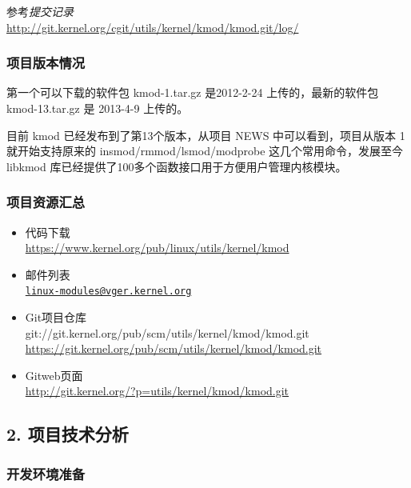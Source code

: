 \documentclass[11pt,a4paper]{article}
\begin{document}
参考\emph{提交记录}\\\url{http://git.kernel.org/cgit/utils/kernel/kmod/kmod.git/log/}

\subsubsection{项目版本情况}

第一个可以下载的软件包 kmod-1.tar.gz 是2012-2-24 上传的，最新的软件包
kmod-13.tar.gz 是 2013-4-9 上传的。

目前 kmod 已经发布到了第13个版本，从项目 NEWS 中可以看到，项目从版本 1
就开始支持原来的 insmod/rmmod/lsmod/modprobe
这几个常用命令，发展至今libkmod
库已经提供了100多个函数接口用于方便用户管理内核模块。

\subsubsection{项目资源汇总}

\begin{itemize}
\item
  代码下载\\ \url{https://www.kernel.org/pub/linux/utils/kernel/kmod}
\item
  邮件列表\\
  \href{mailto:linux-modules@vger.kernel.org}{\texttt{linux-modules@vger.kernel.org}}
\item
  Git项目仓库\\
  git://git.kernel.org/pub/scm/utils/kernel/kmod/kmod.git\\
  \url{https://git.kernel.org/pub/scm/utils/kernel/kmod/kmod.git}
\item
  Gitweb页面\\ \url{http://git.kernel.org/?p=utils/kernel/kmod/kmod.git}
\end{itemize}
\subsection{2. 项目技术分析}

\subsubsection{开发环境准备}
\end{document}
